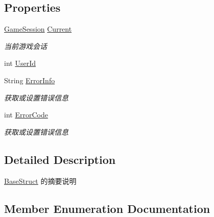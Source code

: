 \subsection*{Properties}
\begin{DoxyCompactItemize}
\item 
\mbox{\hyperlink{class_t_net_1_1_contract_1_1_game_session}{Game\+Session}} \mbox{\hyperlink{class_t_net_1_1_service_1_1_game_struct_abeb1e8da36dcb309df9940ad63874523}{Current}}
\begin{DoxyCompactList}\small\item\em 当前游戏会话 \end{DoxyCompactList}\item 
int \mbox{\hyperlink{class_t_net_1_1_service_1_1_game_struct_a0e9ccf2804e29a3322b8cc9996e5df55}{User\+Id}}
\item 
String \mbox{\hyperlink{class_t_net_1_1_service_1_1_game_struct_acf63cefbccdac681d942c0f2460be872}{Error\+Info}}
\begin{DoxyCompactList}\small\item\em 获取或设置错误信息 \end{DoxyCompactList}\item 
int \mbox{\hyperlink{class_t_net_1_1_service_1_1_game_struct_a90149bea84a7d98184348279018fde45}{Error\+Code}}
\begin{DoxyCompactList}\small\item\em 获取或设置错误信息 \end{DoxyCompactList}\end{DoxyCompactItemize}


\subsection{Detailed Description}
\mbox{\hyperlink{class_t_net_1_1_service_1_1_base_struct}{Base\+Struct}} 的摘要说明 



\subsection{Member Enumeration Documentation}
\mbox{\label{class_t_net_1_1_service_1_1_game_struct_ac7fb463ce72bdf0b12b015c74d2d58da}} 
